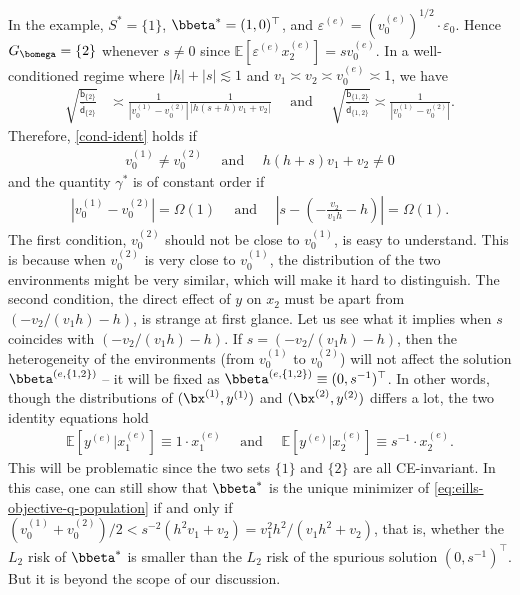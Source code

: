 \documentclass[10pt]{article}
\numberwithin{equation}{section}
\begin{document}
\begin{example}
    {\normalfont In the example, $S^*=\{1\}$, $\bbeta^* = (1,0)^\top$, and $\varepsilon^{(e)} = (v_0^{(e)})^{1/2} \cdot \varepsilon_0$. Hence $G_{\bomega} = \{2\}$ whenever $s\neq 0$ since $\mathbb{E}[\varepsilon^{(e)} x_2^{(e)}] = s v_0^{(e)}$. %
	In a well-conditioned regime where $|h|+|s| \lesssim 1$ and $v_1 \asymp v_2 \asymp v_0^{(e)} \asymp 1$, we have
	\begin{align*}
		\sqrt{\frac{\mathsf{b}_{\{2\}}}{\bar{\mathsf{d}}_{\{2\}}}} %
		&\asymp \frac{1}{|v_0^{(1)} - v_0^{(2)}|} \frac{1}{|h(s+h)v_1 + v_2|} ~~~~~~ \text{and} ~~~~~~ \sqrt{\frac{\mathsf{b}_{\{1,2\}}}{\bar{\mathsf{d}}_{\{1,2\}}}} \asymp \frac{1}{|v_0^{(1)} - v_0^{(2)}|}.
	\end{align*}
	Therefore, \cref{cond-ident} holds if 
	\begin{align}
	\label{eq:toy-example-identification}
		v_0^{(1)} \neq v_0^{(2)} ~~~~~~ \text{and} ~~~~~~ h (h+s) v_1 + v_2 \neq 0 
	\end{align} and the quantity $\gamma^*$ is of constant order if
	\begin{align}
	\label{eq:toy-example-constant-order-gamma-star}
		|v_0^{(1)} - v_0^{(2)}|	= \Omega(1) ~~~~~~ \text{and} ~~~~~~ \left|s - \left(-\frac{v_2}{v_1 h} - h\right)\right| = \Omega(1).
	\end{align} The first condition, $v^{(2)}_0$ should not be close to $v_0^{(1)}$, is easy to understand. This is because when $v_0^{(2)}$ is very close to $v_0^{(1)}$, the distribution of the two environments might be very similar, which will make it hard to distinguish. The second condition, the direct effect of $y$ on $x_2$ must be apart from $(-v_2 / (v_1 h) - h)$, is strange at first glance. Let us see what it implies when $s$ coincides with $(-v_2 / (v_1 h) - h)$. If $s=(-v_2 / (v_1 h) - h)$, then the heterogeneity of the environments (from $v_0^{(1)}$ to $v_0^{(2)}$) will not affect the solution $\bbeta^{(e,\{1,2\})}$ -- it will be fixed as $\bbeta^{(e,\{1,2\})} \equiv (0, s^{-1})^\top$. In other words, though the distributions of $(\bx^{(1)},y^{(1)})$ and $(\bx^{(2)},y^{(2)})$ differs a lot, the two identity equations hold
		\begin{align*}
			\mathbb{E} [y^{(e)}|x_1^{(e)}] \equiv 1\cdot x_1^{(e)} ~~~~~~ \text{and} ~~~~~~ \mathbb{E}[y^{(e)}|x_2^{(e)}] \equiv s^{-1}\cdot x_2^{(e)}.
		\end{align*} This will be problematic since the two sets $\{1\}$ and $\{2\}$ are all CE-invariant. In this case, one can still show that $\bbeta^*$ is the unique minimizer of \eqref{eq:eills-objective-q-population} if and only if
		$(v_0^{(1)} + v_0^{(2)})/2 < s^{-2}(h^2 v_1 + v_2) = v_1^2 h^2 / (v_1 h^2 + v_2)$, that is, whether the $L_2$ risk of $\bbeta^*$ is smaller than the $L_2$ risk of the spurious solution $(0, s^{-1})^\top$. But it is beyond the scope of our discussion. 
	
}
\end{example}
\end{document}
